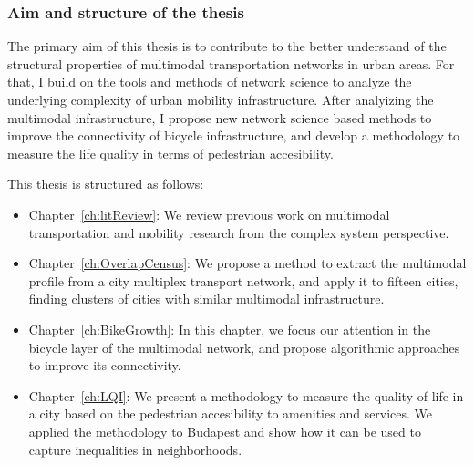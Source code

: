 \subsubsection{Aim and structure of the thesis}
The primary aim of this thesis is to contribute to the better understand of the structural properties of multimodal transportation networks in urban areas. For that, I build on the tools and methods of network science to analyze the underlying complexity of urban mobility infrastructure. After analyizing the multimodal infrastructure, I propose new network science based methods to improve the connectivity of bicycle infrastructure, and develop a methodology to measure the life quality in terms of pedestrian accesibility.

This thesis is structured as follows:

\begin{itemize}
    \item Chapter~\ref{ch:litReview}: We review previous work on multimodal transportation and mobility research from the complex system perspective.
    \item Chapter~\ref{ch:OverlapCensus}: We propose a method to extract the multimodal profile from a city multiplex transport network, and apply it to fifteen cities, finding clusters of cities with similar multimodal infrastructure.
    \item Chapter~\ref{ch:BikeGrowth}: In this chapter, we focus our attention in the bicycle layer of the multimodal network, and propose algorithmic approaches to improve its connectivity.
    \item Chapter~\ref{ch:LQI}: We present a methodology to measure the quality of life in a city based on the pedestrian accesibility to amenities and services. We applied the methodology to Budapest and show how it can be used to capture inequalities in neighborhoods. 
\end{itemize}


